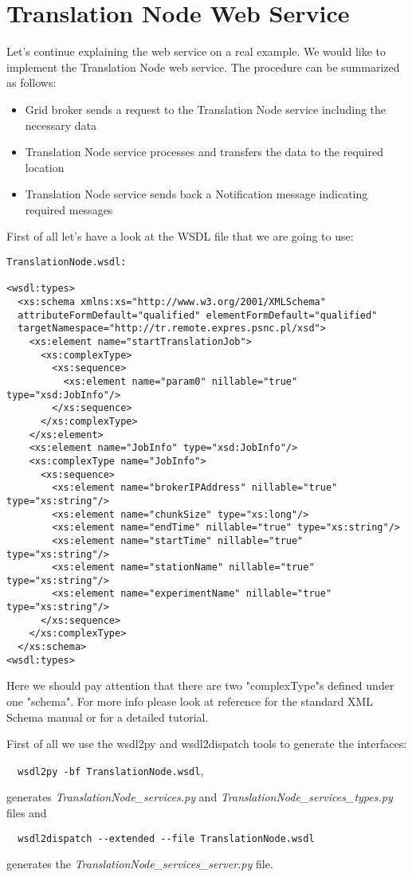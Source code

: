 \section{Translation Node Web Service}\label{tn}

Let's continue explaining the web service on a real example. We would like to
implement the Translation Node web service. The procedure can be summarized as
follows:

\begin{itemize}
  \item Grid broker sends a request to the Translation Node service including
the necessary data
  \item Translation Node service processes and transfers the data to the
required location
  \item Translation Node service sends back a Notification message indicating
required messages
\end{itemize}

First of all let's have a look at the WSDL file that we are going to use:

\begin{verbatim}
TranslationNode.wsdl:

<wsdl:types>
  <xs:schema xmlns:xs="http://www.w3.org/2001/XMLSchema"
  attributeFormDefault="qualified" elementFormDefault="qualified"
  targetNamespace="http://tr.remote.expres.psnc.pl/xsd">
    <xs:element name="startTranslationJob">
      <xs:complexType>
        <xs:sequence>
          <xs:element name="param0" nillable="true" type="xsd:JobInfo"/>
        </xs:sequence>
      </xs:complexType>
    </xs:element>
    <xs:element name="JobInfo" type="xsd:JobInfo"/>
    <xs:complexType name="JobInfo">
      <xs:sequence>
        <xs:element name="brokerIPAddress" nillable="true" type="xs:string"/>
        <xs:element name="chunkSize" type="xs:long"/>
        <xs:element name="endTime" nillable="true" type="xs:string"/>
        <xs:element name="startTime" nillable="true" type="xs:string"/>
        <xs:element name="stationName" nillable="true" type="xs:string"/>
        <xs:element name="experimentName" nillable="true" type="xs:string"/>
      </xs:sequence>
    </xs:complexType>
  </xs:schema>
<wsdl:types>

\end{verbatim} 

Here we should pay attention that there are two "complexType"s defined under one
"schema". For more info please look at reference \cite{xmlman} for the standard
XML Schema manual or \cite{xmltut} for a detailed tutorial.

First of all we use the wsdl2py and wsdl2dispatch tools to generate the
interfaces:

\verb|  wsdl2py -bf TranslationNode.wsdl|,

generates {\it TranslationNode\_services.py} and {\it
TranslationNode\_services\_types.py} files and

\verb|  wsdl2dispatch --extended --file TranslationNode.wsdl|

generates the {\it TranslationNode\_services\_server.py} file.
